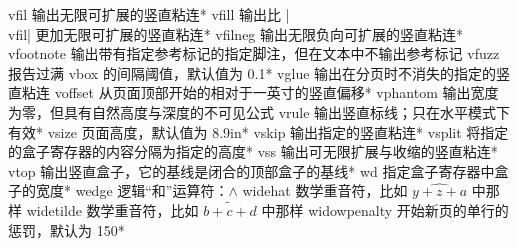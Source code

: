 \capcs vfil {输出无限可扩展的竖直粘连}*{}
\capcs vfill {输出比 |\\vfil| 更加无限可扩展的竖直粘连}*{}
\capcs vfilneg {输出无限负向可扩展的竖直粘连}*{}
\capcs vfootnote {输出带有指定参考标记的指定脚注，但在文本中不输出参考标记}{}{}
\capcs vfuzz {报告过满 vbox 的间隔阈值，默认值为 0.1\pt}*{}
\capcs vglue {输出在分页时不消失的指定的竖直粘连}{}{}
\capcs voffset {从页面顶部开始的相对于一英寸的竖直偏移}*{}
\capcs vphantom {输出宽度为零，但具有自然高度与深度的不可见公式}{}{}
\capcs vrule {输出竖直标线；只在水平模式下有效}*{}
\capcs vsize {页面高度，默认值为 8.9\thinspace in}*{}
\capcs vskip {输出指定的竖直粘连}*{}
\capcs vsplit {将指定的盒子寄存器的内容分隔为指定的高度}*{}
\capcs vss {输出可无限扩展与收缩的竖直粘连}*{}
\capcs vtop {输出竖直盒子，它的基线是闭合的顶部盒子的基线}*{}
\capcs wd {指定盒子寄存器中盒子的宽度}*{}
\capcs wedge {逻辑“和”运算符：$\wedge$}{}{}
\capcs widehat {数学重音符，比如 $\widehat {y+z+a}$ 中那样}{}{}
\capcs widetilde {数学重音符，比如 $\widetilde {b+c+d}$ 中那样}{}{}
\capcs widowpenalty {开始新页的单行的惩罚，默认为 150}*{}
